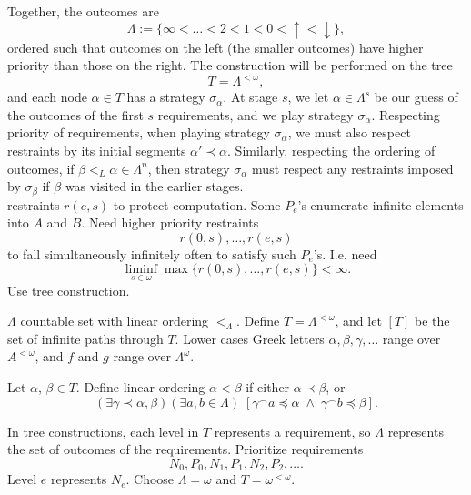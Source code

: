   Together, the outcomes are
  \[\Lambda :=\{\infty <\ldots <2<1<0 <\uparrow <\downarrow\},\]
  ordered such that outcomes on the left (the smaller outcomes) have higher
  priority than those on the right. The construction will be performed on
  the tree
  \[T =\Lambda^{<\omega},\]
  and each node $\alpha\in T$ has a strategy $\sigma_\alpha$. At stage $s$,
  we let $\alpha\in \Lambda^s$ be our guess of the outcomes of the first
  $s$ requirements, and we play strategy $\sigma_\alpha$. Respecting
  priority of requirements, when playing strategy $\sigma_\alpha$, we must
  also respect restraints by its initial segments $\alpha'\prec\alpha$.
  Similarly, respecting the ordering of outcomes, if $\beta<_L\alpha\in
  \Lambda^n$, then strategy $\sigma_\alpha$ must respect any restraints
  imposed by $\sigma_\beta$ if $\beta$ was visited in the earlier
  stages.\\

  restraints $r(e,s)$ to protect computation. Some $P_e$'s enumerate
  infinite elements into $A$ and $B$. Need higher priority restraints
  \[r(0,s),\ldots,r(e,s)\]
  to fall simultaneously infinitely often to satisfy such $P_e$'s. I.e.
  need
  \begin{equation}
    \liminf_{s\in\omega} \max\{r(0,s),\ldots,r(e,s)\} <\infty.
    \label{eqn:liminf}
  \end{equation}
  Use tree construction.

  \begin{definition}
    $\Lambda$ countable set with linear ordering $<_\Lambda$. Define
    $T=\Lambda^{<\omega}$, and let $[T]$ be the set of infinite paths
    through $T$. Lower cases Greek letters $\alpha,\beta,\gamma,\ldots$
    range over $A^{<\omega}$, and $f$ and $g$ range over $\Lambda^\omega$.
  \end{definition}

  \begin{definition}
    Let $\alpha$, $\beta\in T$. Define linear ordering $\alpha<\beta$
    if either $\alpha \prec \beta$, or
    \[(\exists \gamma \prec \alpha, \beta) (\exists a,b \in \Lambda)\;
    [\gamma^\frown a \preceq\alpha\; \wedge\; \gamma^\frown b
    \preceq\beta].\]
  \end{definition}

  In tree constructions, each level in $T$ represents a requirement, so
  $\Lambda$ represents the set of outcomes of the requirements. Prioritize
  requirements
  \[N_0, P_0, N_1, P_1, N_2, P_2, \ldots.\]
  Level $e$ represents $N_e$. Choose $\Lambda=\omega$ and
  $T=\omega^{<\omega}$. \\

